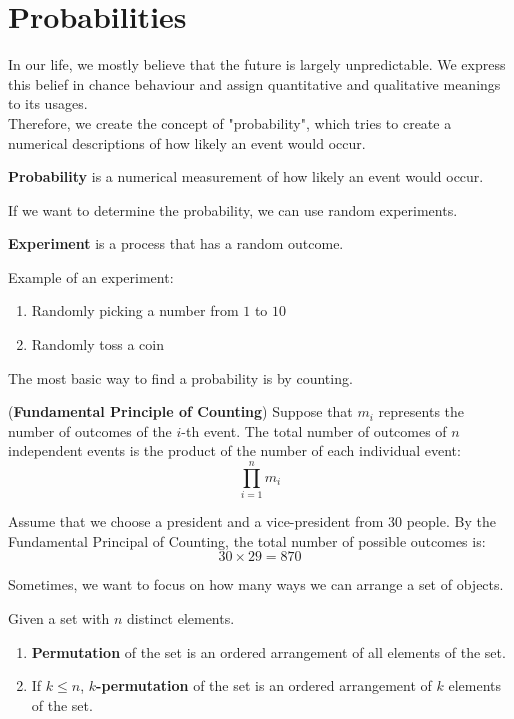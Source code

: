 \documentclass{huhtakm-template-book}
\begin{document}
\section{Probabilities}
In our life, we mostly believe that the future is largely unpredictable. We express this belief in chance behaviour and assign quantitative and qualitative meanings to its usages.\\
Therefore, we create the concept of "probability", which tries to create a numerical descriptions of how likely an event would occur.
\begin{defn}
	\textbf{Probability} is a numerical measurement of how likely an event would occur.
\end{defn}
If we want to determine the probability, we can use random experiments.
\begin{defn}
	\textbf{Experiment} is a process that has a random outcome.
\end{defn}
\begin{eg}
	Example of an experiment:
	\begin{enumerate}
		\item Randomly picking a number from $1$ to $10$
		\item Randomly toss a coin
	\end{enumerate}
\end{eg}
The most basic way to find a probability is by counting.
\begin{thm}(\textbf{Fundamental Principle of Counting})
	Suppose that $m_{i}$ represents the number of outcomes of the $i$-th event. The total number of outcomes of $n$ independent events is the product of the number of each individual event:
	\begin{equation*}
		\prod_{i=1}^{n}m_{i}
	\end{equation*} 
\end{thm}
\begin{eg}
	Assume that we choose a president and a vice-president from $30$ people. By the Fundamental Principal of Counting, the total number of possible outcomes is:
	\begin{equation*}
		30\times 29=870
	\end{equation*}
\end{eg}
Sometimes, we want to focus on how many ways we can arrange a set of objects.
\begin{defn}
	Given a set with $n$ distinct elements.
	\begin{enumerate}
		\item \textbf{Permutation} of the set is an ordered arrangement of all elements of the set.
		\item If $k\leq n$, \textbf{$k$-permutation} of the set is an ordered arrangement of $k$ elements of the set.
	\end{enumerate}
\end{defn}
\end{document}
